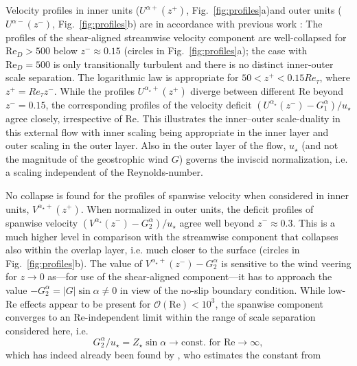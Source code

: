 \documentclass[smallcondensed,final]{svjour3}
\newcommand{\todo}[1]{\textcolor{red}{$[$#1$]$}}
\newcommand{\RE}{\mathrm{Re}}
\begin{document}
%
\par
%
Velocity profiles in inner units ($U^{\alpha+}(z^+)$, Fig.~\ref{fig:profiles}a)and outer units ($U^{\alpha-}(z^-)$, Fig.~\ref{fig:profiles}b)
are in accordance with previous work \citep{coleman:JFM1992,spalart:PF2008,spalart:PF2009,ansorge:BM2014,ansorge:BM2019}:
%
The profiles of the shear-aligned streamwise velocity component are well-collapsed for $\RE_D>500$
below $z^-\approx 0.15$ (circles in Fig.~\ref{fig:profiles}a); the case with $\RE_D=500$ is only transitionally
turbulent and there is no distinct inner-outer scale separation.
The logarithmic law is appropriate for $50 < z^+ < 0.15 Re_\tau$, where $z^+ = Re_\tau z^-$.
%
While the profiles $U^{\alpha_\star+}(z^+)$ diverge between different $\RE$ beyond $z^-=0.15$,
the corresponding profiles of the velocity deficit  $(U^{\alpha_\star}(z^-) - G_{1}^{\alpha} ) /u_\star$
agree closely, irrespective of $\RE$.
%
This illustrates the inner--outer scale-duality in this external flow with inner scaling being
appropriate in the inner layer and outer scaling in the outer layer. 
%
Also in the outer layer of the flow, $u_\star$ (and not the magnitude of the
geostrophic wind $G$) governs the inviscid normalization, i.e. a scaling independent of the Reynolds-number.
%
\par
%
No collapse is found for the profiles of spanwise velocity when considered in inner units, $V^{\alpha_\star+}(z^+)$. 
%
When normalized in outer units, the deficit profiles of spanwise velocity
$(V^{\alpha_\star}(z^-)-G_{2}^{\alpha})/u_\star$
agree well beyond $z^-\approx 0.3$. %
This is a much higher level in comparison with the streamwise component that collapses
also within the overlap layer, i.e. much closer to the surface
(circles in Fig.~\ref{fig:profiles}b).
%
The value of $V^{\alpha_\star+}(z^-)-G_{2}^{\alpha}$ is sensitive to the wind veering for
$z\rightarrow 0$ as---for use of the shear-aligned component---it has to approach the value
$-G_2^\alpha=|G|\sin\alpha\ne0$ in view of the no-slip boundary condition.  
%
While low-$\RE$ effects appear to be present for $\mathcal{O}(\RE)<10^3$, the spanwise component
converges to an $\RE$-independent limit within the range of scale separation considered
here, i.e.
\begin{equation}
  G_{2}^{\alpha}/u_\star = Z_\star \sin\alpha \rightarrow \text{const. for\ }\RE\rightarrow \infty, 
\end{equation}
which has indeed already been found by \cite{spalart:JFM1989}, who estimates the constant from
\end{document}
